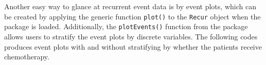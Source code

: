 Another easy way to glance at recurrent event data is by event plots,
which can be created by applying the generic function \texttt{plot()} to
the \texttt{Recur} object when the  package is loaded.
Additionally, the \texttt{plotEvents()} function from the 
package allows users to stratify the event plots by discrete variables.
The following codes produces event plots with and without stratifying by
whether the patients receive chemotherapy.

\begin{Shaded}
\end{Shaded}

